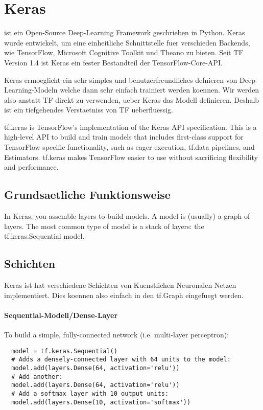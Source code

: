 \section{Keras}
 ist ein Open-Source Deep-Learning Framework geschrieben in
Python. Keras wurde entwickelt, um eine einheitliche Schnittstelle fuer
verschieden Backends, wie TensorFlow, Microsoft Cognitive Toolkit und Theano zu
bieten. Seit TF Version 1.4 ist Keras ein fester Bestandteil der TensorFlow-Core-API.

Keras ermoeglicht ein sehr simples und benutzerfreundliches defnieren von
Deep-Learning-Modeln welche dann sehr einfach trainiert werden koennen.
Wir werden also anstatt TF direkt zu verwenden, ueber Keras das Modell definieren.
Deshalb ist ein tiefgehendes Verstaetniss von TF ueberfluessig.

tf.keras is TensorFlow's implementation of the Keras API specification. This is a high-level API to build and train models that includes first-class support for TensorFlow-specific functionality, such as eager execution, tf.data pipelines, and Estimators. tf.keras makes TensorFlow easier to use without sacrificing flexibility and performance.

\subsection{Grundsaetliche Funktionsweise}
In Keras, you assemble layers to build models. A model is (usually) a graph of layers. The most common type of model is a stack of layers: the tf.keras.Sequential model.

\subsection{Schichten}
Keras ist hat verschiedene Schichten von Kuenstlichen Neuronalen Netzen
implementiert. Dies koennen also einfach in den tf.Graph eingefuegt werden.

\paragraph{Sequential-Modell/Dense-Layer}
To build a simple, fully-connected network (i.e. multi-layer perceptron):
\begin{verbatim}
  model = tf.keras.Sequential()
  # Adds a densely-connected layer with 64 units to the model:
  model.add(layers.Dense(64, activation='relu'))
  # Add another:
  model.add(layers.Dense(64, activation='relu'))
  # Add a softmax layer with 10 output units:
  model.add(layers.Dense(10, activation='softmax'))
\end{verbatim}


